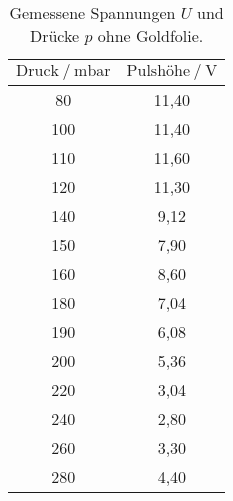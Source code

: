 \begin{table}[H]
   \centering
   \caption{Gemessene Spannungen $U$ und Drücke $p$ ohne Goldfolie.}
   \label{tab:ohne2}
   \begin{tabular} { c c }
 \toprule
 {$\text{Druck}\:/\: \mathrm{mbar}$} & {$\text{Pulshöhe}\:/\: \mathrm{V}$} \\ 
    \midrule
    80 & 11,40 \\
    100 & 11,40 \\
    110 & 11,60 \\
    120 & 11,30 \\
    140 & 9,12 \\
    150 & 7,90 \\
    160 & 8,60 \\
    180 & 7,04 \\
    190 & 6,08 \\
    200 & 5,36 \\
    220 & 3,04 \\
    240 & 2,80 \\
    260 & 3,30 \\
    280 & 4,40 \\
    \bottomrule
  \end{tabular}
\end{table}
